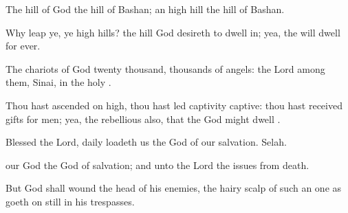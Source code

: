 {\Q {}The
hill of
God
{} the
hill of
Bashan; an
high
hill
{} the
hill of
Bashan.


\par }{\Q {}Why
leap ye, ye
high
hills?
{} the
hill
{}
God
desireth to dwell
in; yea, the
{} will
dwell
{} for
ever.


\par }{\Q {}The
chariots of
God
{} twenty
thousand,
{}
thousands of
angels: the
Lord
{} among them,
{}
Sinai, in the
holy
{}.


\par }{\Q {}Thou hast
ascended on
high, thou hast led
captivity
captive: thou hast
received
gifts for
men; yea,
{} the
rebellious also, that the
{}
God might
dwell
{}.


\par }{\Q {}Blessed
{} the
Lord,
{}
daily
loadeth us
{} the
God of our
salvation.
Selah.


\par }{\Q {} our
God
{} the
God of
salvation; and unto
{} the
Lord
{} the
issues from
death.


\par }{\Q {}But
God shall
wound the
head of his
enemies,
{} the
hairy
scalp of such an one as goeth on
still in his
trespasses.


\par }{\BB \par }
